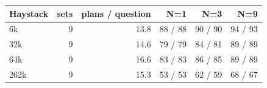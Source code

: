 \begin{tabular}{lrrrrr}
\toprule
Haystack & sets & plans / question & N=1 & N=3 & N=9 \\
\midrule
6k & 9 & 13.8 & 88 / 88 & 90 / 90 & 94 / 93 \\
32k & 9 & 14.6 & 79 / 79 & 84 / 81 & 89 / 89 \\
64k & 9 & 16.6 & 83 / 83 & 86 / 85 & 89 / 89 \\
262k & 9 & 15.3 & 53 / 53 & 62 / 59 & 68 / 67 \\
\bottomrule
\end{tabular}